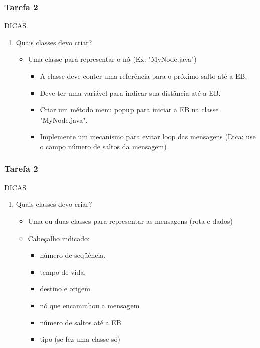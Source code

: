 \documentclass{beamer}
\begin{document}
\begin{frame}
	\frametitle{Tarefa 2}
	\begin{block}{DICAS}
		\begin{enumerate}
			\item Quais classes devo criar?
			\begin{itemize}
				\item Uma classe para representar o nó (Ex: "MyNode.java")
				\begin{itemize}
					\item A classe deve conter uma referência para o próximo salto até a EB.
					\item Deve ter uma variável para indicar sua distância até a EB.
					\item Criar um método menu popup para iniciar a EB na classe "MyNode.java".
					\item Implemente um mecanismo para evitar loop das mensagens (Dica: use o campo número de saltos da mensagem)
				\end{itemize}
			\end{itemize}
		\end{enumerate}
	\end{block}
\end{frame}

\begin{frame}
	\frametitle{Tarefa 2}
	\begin{block}{DICAS}
		\begin{enumerate}
			\item Quais classes devo criar?
			\begin{itemize}
				\item Uma ou duas classes para representar as mensagens (rota e dados)
				\item Cabeçalho indicado: 
				\begin{itemize}
					\item número de seqüência.
					\item tempo de vida.
					\item destino e origem.
					\item nó que encaminhou a mensagem
					\item número de saltos até a EB
					\item tipo (se fez uma classe só)
				\end{itemize}
			\end{itemize}
		\end{enumerate}
	\end{block}
\end{frame}
\end{document}
